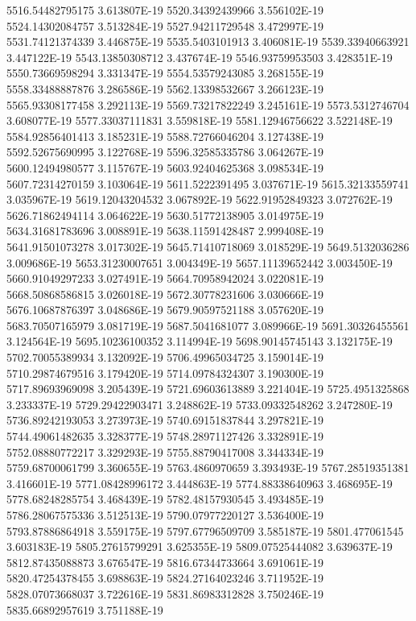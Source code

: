 5516.54482795175  3.613807E-19
5520.34392439966  3.556102E-19
5524.14302084757  3.513284E-19
5527.94211729548  3.472997E-19
5531.74121374339  3.446875E-19
5535.5403101913  3.406081E-19
5539.33940663921  3.447122E-19
5543.13850308712  3.437674E-19
5546.93759953503  3.428351E-19
5550.73669598294  3.331347E-19
5554.53579243085  3.268155E-19
5558.33488887876  3.286586E-19
5562.13398532667  3.266123E-19
5565.93308177458  3.292113E-19
5569.73217822249  3.245161E-19
5573.5312746704  3.608077E-19
5577.33037111831  3.559818E-19
5581.12946756622  3.522148E-19
5584.92856401413  3.185231E-19
5588.72766046204  3.127438E-19
5592.52675690995  3.122768E-19
5596.32585335786  3.064267E-19
5600.12494980577  3.115767E-19
5603.92404625368  3.098534E-19
5607.72314270159  3.103064E-19
5611.5222391495  3.037671E-19
5615.32133559741  3.035967E-19
5619.12043204532  3.067892E-19
5622.91952849323  3.072762E-19
5626.71862494114  3.064622E-19
5630.51772138905  3.014975E-19
5634.31681783696  3.008891E-19
5638.11591428487  2.999408E-19
5641.91501073278  3.017302E-19
5645.71410718069  3.018529E-19
5649.5132036286  3.009686E-19
5653.31230007651  3.004349E-19
5657.11139652442  3.003450E-19
5660.91049297233  3.027491E-19
5664.70958942024  3.022081E-19
5668.50868586815  3.026018E-19
5672.30778231606  3.030666E-19
5676.10687876397  3.048686E-19
5679.90597521188  3.057620E-19
5683.70507165979  3.081719E-19
5687.5041681077  3.089966E-19
5691.30326455561  3.124564E-19
5695.10236100352  3.114994E-19
5698.90145745143  3.132175E-19
5702.70055389934  3.132092E-19
5706.49965034725  3.159014E-19
5710.29874679516  3.179420E-19
5714.09784324307  3.190300E-19
5717.89693969098  3.205439E-19
5721.69603613889  3.221404E-19
5725.4951325868  3.233337E-19
5729.29422903471  3.248862E-19
5733.09332548262  3.247280E-19
5736.89242193053  3.273973E-19
5740.69151837844  3.297821E-19
5744.49061482635  3.328377E-19
5748.28971127426  3.332891E-19
5752.08880772217  3.329293E-19
5755.88790417008  3.344334E-19
5759.68700061799  3.360655E-19
5763.4860970659  3.393493E-19
5767.28519351381  3.416601E-19
5771.08428996172  3.444863E-19
5774.88338640963  3.468695E-19
5778.68248285754  3.468439E-19
5782.48157930545  3.493485E-19
5786.28067575336  3.512513E-19
5790.07977220127  3.536400E-19
5793.87886864918  3.559175E-19
5797.67796509709  3.585187E-19
5801.477061545  3.603183E-19
5805.27615799291  3.625355E-19
5809.07525444082  3.639637E-19
5812.87435088873  3.676547E-19
5816.67344733664  3.691061E-19
5820.47254378455  3.698863E-19
5824.27164023246  3.711952E-19
5828.07073668037  3.722616E-19
5831.86983312828  3.750246E-19
5835.66892957619  3.751188E-19
